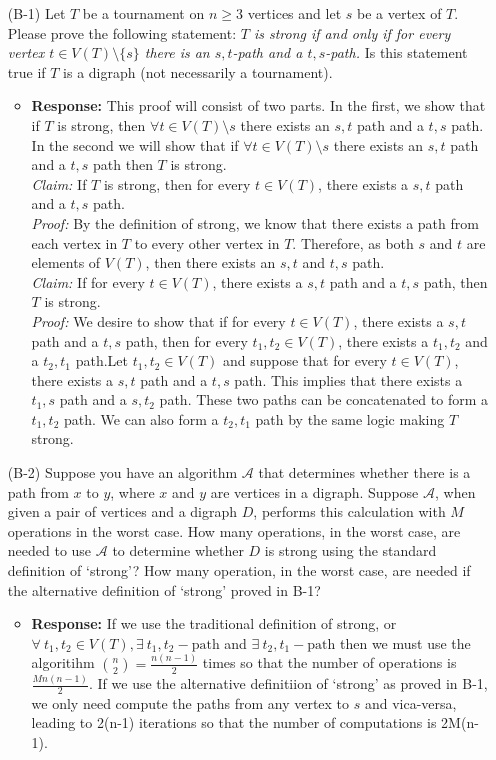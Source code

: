 \documentclass{article}
\newcommand{\response}[1]{\begin{itemize} \item {\bf Response: } #1 \end{itemize}}
\begin{document}
\begin{enumerate}
	\item[(B-1)] Let $T$ be a tournament on $n \geq 3$ vertices and let $s$ be a vertex of $T$.  Please prove the following statement: \emph{$T$ is strong if and only if for every vertex $t \in V(T) \setminus \{s\}$ there is an $s,t$-path and a $t,s$-path.}  Is this statement true if $T$ is a digraph (not necessarily a tournament).  
		\response{This proof will consist of two parts. In the first, we show that if $T$ is strong, then $\forall t \in V(T)\setminus s$ there exists an $s,t$ path and a $t,s$ path. In the second we will show that if $\forall t \in V(T)\setminus s$ there exists an $s,t$ path and a $t,s$ path then $T$ is strong.\\[1em]
		{\it Claim: } If $T$ is strong, then for every $t \in V(T)$, there exists a $s,t$ path and a $t,s$ path. \\[1em]
		{\it Proof: } By the definition of strong, we know that there exists a path from each vertex in $T$ to every other vertex in $T$. Therefore, as both $s$ and $t$ are elements of $V(T)$, then there exists an $s,t$ and $t,s$ path.\\[1em]
		{\it Claim: } If for every $t \in V(T)$, there exists a $s,t$ path and a $t,s$ path, then $T$ is strong.\\[1em]
		{\it Proof: } We desire to show that if for every $t \in V(T)$, there exists a $s,t$ path and a $t,s$ path, then for every $t_1,t_2 \in V(T)$, there exists a $t_1,t_2$ and a $t_2,t_1$ path.Let $t_1,t_2 \in V(T)$ and suppose that for every $t \in V(T)$, there exists a $s,t$ path and a $t,s$ path. This implies that there exists a $t_1,s$ path and a $s,t_2$ path. These two paths can be concatenated to form a $t_1,t_2$ path.  We can also form a $t_2,t_1$ path by the same logic making $T$ strong.}
	\item[(B-2)] Suppose you have an algorithm $\mathcal{A}$ that determines whether there is a path from $x$ to $y$, where $x$ and $y$ are vertices in a digraph.  Suppose $\mathcal{A}$, when given a pair of vertices and a digraph $D$, performs this calculation with $M$ operations in the worst case.  How many operations, in the worst case, are needed to use $\mathcal{A}$ to determine whether $D$ is strong using the standard definition of `strong'?  How many operation, in the worst case, are needed if the alternative definition of `strong' proved in B-1?
		\response{If we use the traditional definition of strong, or $\forall \ t_1, t_2 \in V(T), \exists \ t_1,t_2-\text{path}$ and $\exists \ t_2,t_1-\text{path}$ then we must use the algoritihm ${n \choose 2} = \frac{n(n-1)}{2}$ times so that the number of operations is $\frac{Mn(n-1)}{2}$. If we use the alternative definitiion of `strong' as proved in B-1, we only need compute the paths from any vertex to $s$ and vica-versa, leading to 2(n-1) iterations so that the number of computations is 2M(n-1).} 
\end{enumerate}
\end{document}
